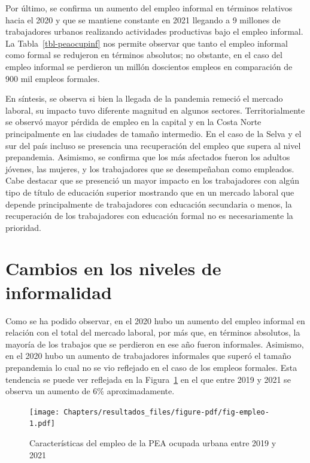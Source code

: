 \documentclass[
  letterpaper,
  12pt,
  oneside,
  spanish,
  doublespacing,
  headsepline,
  parskip]{MastersDoctoralThesis}
\begin{document}
Por último, se confirma un aumento del empleo informal en términos
relativos hacia el 2020 y que se mantiene constante en 2021 llegando a 9
millones de trabajadores urbanos realizando actividades productivas bajo
el empleo informal. La Tabla~\ref{tbl-peaocupinf} nos permite observar
que tanto el empleo informal como formal se redujeron en términos
absolutos; no obstante, en el caso del empleo informal se perdieron un
millón doscientos empleos en comparación de 900 mil empleos formales.

En síntesis, se observa si bien la llegada de la pandemia remeció el
mercado laboral, su impacto tuvo diferente magnitud en algunos sectores.
Territorialmente se observó mayor pérdida de empleo en la capital y en
la Costa Norte principalmente en las ciudades de tamaño intermedio. En
el caso de la Selva y el sur del país incluso se presencia una
recuperación del empleo que supera al nivel prepandemia. Asimismo, se
confirma que los más afectados fueron los adultos jóvenes, las mujeres,
y los trabajadores que se desempeñaban como empleados. Cabe destacar que
se presenció un mayor impacto en los trabajadores con algún tipo de
título de educación superior mostrando que en un mercado laboral que
depende principalmente de trabajadores con educación secundaria o menos,
la recuperación de los trabajadores con educación formal no es
necesariamente la prioridad.

\hypertarget{cambios-en-los-niveles-de-informalidad}{%
\section{Cambios en los niveles de
informalidad}\label{cambios-en-los-niveles-de-informalidad}}

Como se ha podido observar, en el 2020 hubo un aumento del empleo
informal en relación con el total del mercado laboral, por más que, en
términos absolutos, la mayoría de los trabajos que se perdieron en ese
año fueron informales. Asimismo, en el 2020 hubo un aumento de
trabajadores informales que superó el tamaño prepandemia lo cual no se
vio reflejado en el caso de los empleos formales. Esta tendencia se
puede ver reflejada en la Figura~\ref{fig-empleo} en el que entre 2019 y
2021 se observa un aumento de 6\% aproximadamente.

\begin{figure}

\caption{\label{fig-empleo}Características del empleo de la PEA ocupada
urbana entre 2019 y 2021}

{\centering \texttt{[image: Chapters/resultados\_files/figure-pdf/fig-empleo-1.pdf]}

}

\end{figure}
\end{document}
